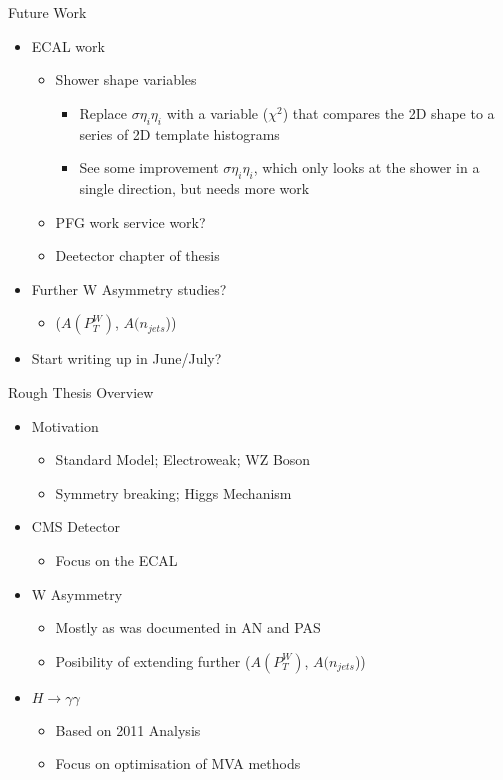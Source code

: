 \documentclass[t]{beamer}
\begin{document}
 \begin{frame}{Future Work}
     \begin{itemize}  
       \item ECAL work
       \begin{itemize}  	
         \item Shower shape variables
         \begin{itemize}  
           \item Replace $\sigma \eta_{i} \eta_{i}$ with a variable ($\chi^{2}$) that compares the 2D shape to a series of 2D template histograms
 	  \item See some improvement $\sigma \eta_{i} \eta_{i}$, which only looks at the shower in a single direction, but needs more work
         \end{itemize}  
         \item PFG work service work? 
         \item Deetector chapter of thesis
       \end{itemize}
       \item Further W Asymmetry studies? 
         \begin{itemize}  
           \item ($A(P_T^W)$, $A(n_{jets}$))
         \end{itemize}  
       \item Start writing up in June/July?
     \end{itemize}
 \end{frame}
 
 \begin{frame}{Rough Thesis Overview}
     \begin{itemize}  
       \item Motivation
       \begin{itemize}  
 	\item Standard Model; Electroweak; WZ Boson
 	\item Symmetry breaking; Higgs Mechanism
       \end{itemize}  
       \item CMS Detector
       \begin{itemize}  
 	\item Focus on the ECAL
       \end{itemize}  
       \item W Asymmetry
       \begin{itemize}  
 	\item Mostly as was documented in AN and PAS
 	\item Posibility of extending further ($A(P_T^W)$, $A(n_{jets}$))
       \end{itemize}  
       \item $H\to\gamma\gamma$
       \begin{itemize}  
 	\item Based on 2011 Analysis
 	\item Focus on optimisation of MVA methods
       \end{itemize}  
     \end{itemize}  
 \end{frame}
 
\end{document}
